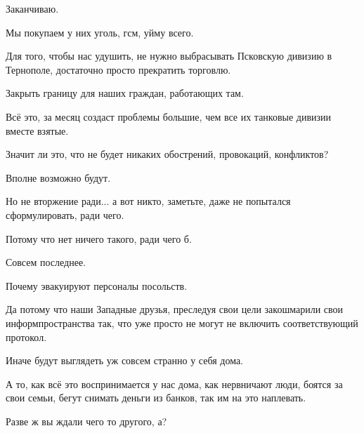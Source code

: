 Заканчиваю.

Мы покупаем у них уголь, гсм, уйму всего.

Для того, чтобы нас удушить, не нужно выбрасывать Псковскую дивизию в
Тернополе, достаточно просто прекратить торговлю.

Закрыть границу для наших граждан, работающих там.

Всё это, за месяц создаст проблемы большие, чем все их танковые дивизии вместе
взятые.

Значит ли это, что не будет никаких обострений, провокаций, конфликтов?

Вполне возможно будут.

Но не вторжение ради... а вот никто, заметьте, даже не попытался
сформулировать, ради чего.

Потому что нет ничего такого, ради чего б.

Совсем последнее.

Почему эвакуируют персоналы посольств.

Да потому что наши Западные друзья, преследуя свои цели закошмарили свои
информпространства так, что уже просто не могут не включить соответствующий
протокол.

Иначе будут выглядеть уж совсем странно у себя дома.

А то, как всё это воспринимается у нас дома, как нервничают люди, боятся за
свои семьи, бегут снимать деньги из банков, так им на это наплевать.

Разве ж вы ждали чего то другого, а?
